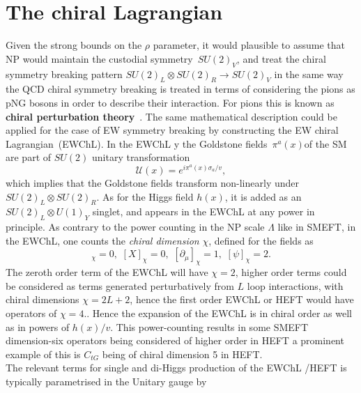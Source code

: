 \section{The chiral Lagrangian \label{sec:chiral}}
Given the strong bounds on the $\rho$ parameter, it would plausible to assume that NP would maintain the custodial symmetry~$SU(2)_V$, and treat the chiral symmetry breaking pattern $SU(2)_L \otimes SU(2)_R \to SU(2)_V$ in the same way the QCD chiral symmetry breaking is treated in terms of considering the pions as pNG bosons in order to describe their interaction. For pions this is known as \textbf{chiral perturbation theory}~\cite{GASSER1984142,GASSER1985465}. The same mathematical description could be applied for the case of EW symmetry breaking by constructing the EW chiral Lagrangian~(EWChL).   In the EWChL y the Goldstone fields~$\pi^a(x)$of the SM  are part of $SU(2)$ unitary transformation
\begin{equation}
 \mathcal U(x) = e^{ i \pi^a(x)\sigma_a/v }, 
\end{equation}
which implies that the Goldstone fields transform non-linearly under~$SU(2)_L \otimes SU(2)_R$.  As for the Higgs field $h(x)$, it is added as an $SU(2)_L \otimes U(1)_Y$ singlet, and appears in the EWChL at any power in principle. As contrary to the power counting in the NP scale $ \Lambda$ like in SMEFT, in the EWChL, one counts the \emph{chiral dimension} $\chi$, defined for the fields as~\cite{Buchalla:2013rka,Buchalla:2015wfa}
\begin{equation}
[\phi]_\chi =0,\,\, [X]_\chi =0,\,\, [\partial_\mu ]_\chi =1, \,\, [\psi]_\chi =2.
\end{equation}
The zeroth order term of the EWChL will have $\chi=2$, higher order terms could be considered as terms generated perturbatively from $L$ loop interactions, with chiral dimensions $\chi= 2L+2$, hence the first order EWChL or HEFT would have operators of $\chi=4$.. Hence the expansion of the EWChL is in chiral order as well as in powers of $h(x)/v$. This power-counting results in some SMEFT dimension-six operators being considered of higher order in  HEFT a prominent example of this is $C_{tG}$ being of chiral dimension 5 in HEFT. \\
The relevant terms for single and di-Higgs production of the EWChL /HEFT is typically parametrised in the Unitary gauge by~\cite{LHCHiggsCrossSectionWorkingGroup:2016ypw,DiVita:2017eyz}
